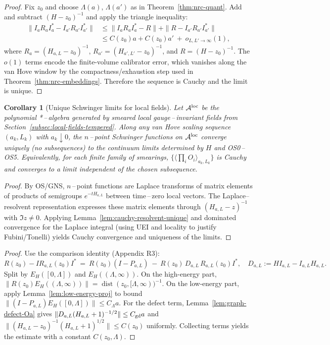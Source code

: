 \documentclass[11pt]{amsart}
\theoremstyle{plain}
\newtheorem{corollary}[theorem]{Corollary}
\theoremstyle{definition}
\theoremstyle{remark}
\begin{document}
\begin{proof}
Fix $z_0$ and choose $\Lambda(a)$, $\Lambda(a')$ as in Theorem~\ref{thm:nrc-quant}. Add and subtract $(H-z_0)^{-1}$ and apply the triangle inequality:
\[
\begin{aligned}
\| I_{a}R_a I_{a}^* - I_{a'}R_{a'} I_{a'}^* \|
&\le \| I_{a}R_a I_{a}^* - R \| + \| R - I_{a'}R_{a'} I_{a'}^* \|\\
&\le C(z_0) a + C(z_0) a'\ +\ o_{L,L'\to\infty}(1),
\end{aligned}
\]
where $R_a=(H_{a,L}-z_0)^{-1}$, $R_{a'}=(H_{a',L'}-z_0)^{-1}$, and $R=(H-z_0)^{-1}$. The $o(1)$ terms encode the finite-volume calibrator error, which vanishes along the van Hove window by the compactness/exhaustion step used in Theorem~\ref{thm:nrc-embeddings}. Therefore the sequence is Cauchy and the limit is unique.
\end{proof}
\begin{corollary}[Unique Schwinger limits for local fields]\label{cor:unique-schwinger-local}
Let $\mathcal A^{\rm loc}$ be the polynomial *\,–\,algebra generated by smeared local gauge\,–\,invariant fields from Section~\ref{subsec:local-fields-tempered}. Along any van Hove scaling sequence $(a_k,L_k)$ with $a_k\downarrow 0$, the $n$\,–\,point Schwinger functions on $\mathcal A^{\rm loc}$ converge uniquely (no subsequences) to the continuum limits determined by $H$ and OS0\,–\,OS5. Equivalently, for each finite family of smearings, $\{\langle \prod_i O_i\rangle_{a_k,L_k}\}$ is Cauchy and converges to a limit independent of the chosen subsequence.
\end{corollary}

\begin{proof}
By OS/GNS, $n$\,–\,point functions are Laplace transforms of matrix elements of products of semigroups $e^{-tH_{a,L}}$ between time\,–\,zero local vectors. The Laplace–resolvent representation expresses these matrix elements through $(H_{a,L}-z)^{-1}$ with $\Im z\ne 0$. Applying Lemma~\ref{lem:cauchy-resolvent-unique} and dominated convergence for the Laplace integral (using UEI and locality to justify Fubini/Tonelli) yields Cauchy convergence and uniqueness of the limits.
\end{proof}

\begin{proof}
Use the comparison identity (Appendix R3):
\[
  R(z_0)-I R_{a,L}(z_0) I^*\ =\ R(z_0)(I-P_{a,L})\ -\ R(z_0)\,D_{a,L}\,R_{a,L}(z_0) I^*,\quad D_{a,L}:=H I_{a,L}-I_{a,L}H_{a,L}.
\]
Split by $E_H([0,\Lambda])$ and $E_H((\Lambda,\infty))$. On the high-energy part, $\|R(z_0) E_H((\Lambda,\infty))\|=\operatorname{dist}(z_0,[\Lambda,\infty))^{-1}$. On the low-energy part, apply Lemma~\ref{lem:low-energy-proj} to bound $\|(I-P_{a,L})E_H([0,\Lambda])\|\le C_\Lambda a$. For the defect term, Lemma~\ref{lem:graph-defect-Oa} gives $\|D_{a,L}(H_{a,L}+1)^{-1/2}\|\le C_{\rm gd} a$ and $\|(H_{a,L}-z_0)^{-1}(H_{a,L}+1)^{1/2}\|\le C(z_0)$ uniformly. Collecting terms yields the estimate with a constant $C(z_0,\Lambda)$.
\end{proof}
\end{document}
